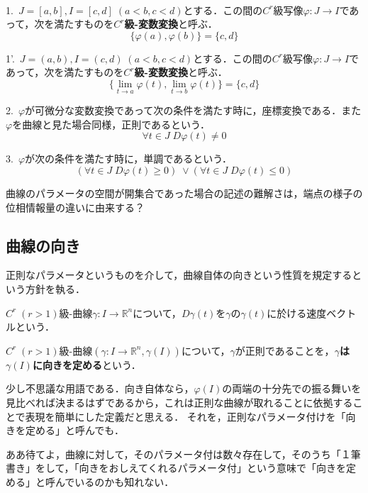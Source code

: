 \documentclass[uplatex, 12pt, dvipdfmx]{jsarticle}
\begin{document}
\begin{definition}\rm{}　
    
    1.\, $J=[a,b],I=[c,d]\;(a<b,c<d)$とする．この間の$C^r$級写像$\varphi:J\to I$であって，次を満たすものを\textbf{$C^r$級-変数変換}と呼ぶ．
    \[ \{\varphi(a),\varphi(b)\}=\{c,d\} \]

    1'.\, $J=(a,b),I=(c,d)\;(a<b,c<d)$とする．この間の$C^r$級写像$\varphi:J\to I$であって，次を満たすものを\textbf{$C^r$級-変数変換}と呼ぶ．
    \[ \{\lim_{t\to a}\varphi(t),\lim_{t\to b}\varphi(t)\}=\{c,d\} \]

    2.\, $\varphi$が可微分な変数変換であって次の条件を満たす時に，座標変換である．また$\varphi$を曲線と見た場合同様，正則であるという．
    \[ \forall t\in J\; D\varphi(t)\ne 0 \]

    3.\, $\varphi$が次の条件を満たす時に，単調であるという．
    \[ (\forall t\in J\; D\varphi(t)\ge 0)\;\lor (\forall t\in J\; D\varphi(t)\le 0) \]
\end{definition}
\begin{remark}
    曲線のパラメータの空間が開集合であった場合の記述の難解さは，端点の様子の位相情報量の違いに由来する？
\end{remark}

\subsection{曲線の向き}
正則なパラメータというものを介して，曲線自体の向きという性質を規定するという方針を執る．

\begin{definition}[速度ベクトル]
    $C^r\;(r>1)$級-曲線$\gamma:I\to\mathbb{R}^n$について，$D\gamma(t)$を$\gamma$の$\gamma (t)$に於ける速度ベクトルという．
\end{definition}

\begin{definition}[曲線に向きを定めるパラメータ]
    $C^r\;(r>1)$級-曲線$(\gamma:I\to\mathbb{R}^n, \gamma(I))$について，$\gamma$が正則であることを，\textbf{$\gamma$は$\gamma(I)$に向きを定める}という．
\end{definition}
\begin{remark}
    少し不思議な用語である．向き自体なら，$\varphi(I)$の両端の十分先での振る舞いを見比べれば決まるはずであるから，これは正則な曲線が取れることに依拠することで表現を簡単にした定義だと思える．
    それを，正則なパラメータ付けを「向きを定める」と呼んでも．

    ああ待てよ，曲線に対して，そのパラメータ付は数々存在して，そのうち「１筆書き」をして，「向きをおしえてくれるパラメータ付」という意味で「向きを定める」と呼んでいるのかも知れない．
\end{remark}
\end{document}
